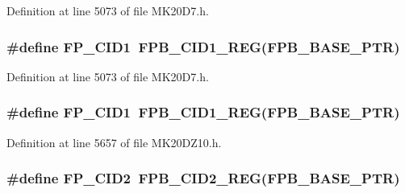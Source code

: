 Definition at line 5073 of file M\+K20\+D7.\+h.

\subsubsection[{\texorpdfstring{F\+P\+\_\+\+C\+I\+D1}{FP_CID1}}]{\setlength{\rightskip}{0pt plus 5cm}\#define F\+P\+\_\+\+C\+I\+D1~{\bf F\+P\+B\+\_\+\+C\+I\+D1\+\_\+\+R\+EG}({\bf F\+P\+B\+\_\+\+B\+A\+S\+E\+\_\+\+P\+TR})}\hypertarget{group___f_p_b___register___accessor___macros_gae72090dc299cc0ce88752ac1aef4a17f}{}\label{group___f_p_b___register___accessor___macros_gae72090dc299cc0ce88752ac1aef4a17f}


Definition at line 5073 of file M\+K20\+D7.\+h.

\subsubsection[{\texorpdfstring{F\+P\+\_\+\+C\+I\+D1}{FP_CID1}}]{\setlength{\rightskip}{0pt plus 5cm}\#define F\+P\+\_\+\+C\+I\+D1~{\bf F\+P\+B\+\_\+\+C\+I\+D1\+\_\+\+R\+EG}({\bf F\+P\+B\+\_\+\+B\+A\+S\+E\+\_\+\+P\+TR})}\hypertarget{group___f_p_b___register___accessor___macros_gae72090dc299cc0ce88752ac1aef4a17f}{}\label{group___f_p_b___register___accessor___macros_gae72090dc299cc0ce88752ac1aef4a17f}


Definition at line 5657 of file M\+K20\+D\+Z10.\+h.

\subsubsection[{\texorpdfstring{F\+P\+\_\+\+C\+I\+D2}{FP_CID2}}]{\setlength{\rightskip}{0pt plus 5cm}\#define F\+P\+\_\+\+C\+I\+D2~{\bf F\+P\+B\+\_\+\+C\+I\+D2\+\_\+\+R\+EG}({\bf F\+P\+B\+\_\+\+B\+A\+S\+E\+\_\+\+P\+TR})}\hypertarget{group___f_p_b___register___accessor___macros_ga8567b72cab0a5adaed761d5b545f678e}{}\label{group___f_p_b___register___accessor___macros_ga8567b72cab0a5adaed761d5b545f678e}



